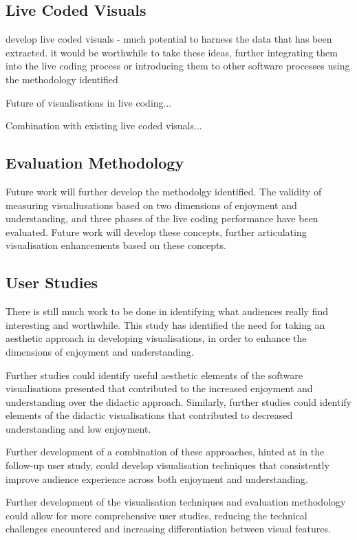 \subsection{Live Coded Visuals}

develop live coded visuals - much potential to harness the data that has been extracted. it would be worthwhile to take these ideas, further integrating them into the live coding process or introducing them to other software processes using the methodology identified

Future of visualisations in live coding...

Combination with existing live coded visuals...

\subsection{Evaluation Methodology}

Future work will further develop the methodolgy identified. The validity of measuring visualiusations based on two dimensions of enjoyment and understanding, and three phases of the live coding performance have been evaluated. Future work will develop these concepts, further articulating visualisation enhancements based on these concepts. 

\subsection{User Studies}

There is still much work to be done in identifying what audiences really find interesting and worthwhile. This study has identified the need for taking an aesthetic approach in developing visualisations, in order to enhance the dimensions of enjoyment and understanding. 

Further studies could identify useful aesthetic elements of the software visualisations presented that contributed to the increased enjoyment and understanding over the didactic approach. Similarly, further studies could identify elements of the didactic visualisations that contributed to decreased understanding and low enjoyment.

Further development of a combination of these approaches, hinted at in the follow-up user study, could develop visualisation techniques that consistently improve audience experience across both enjoyment and understanding.

Further development of the visualisation techniques and evaluation methodology could allow for more comprehensive user studies, reducing the technical challenges encountered and increasing differentiation between visual features.

